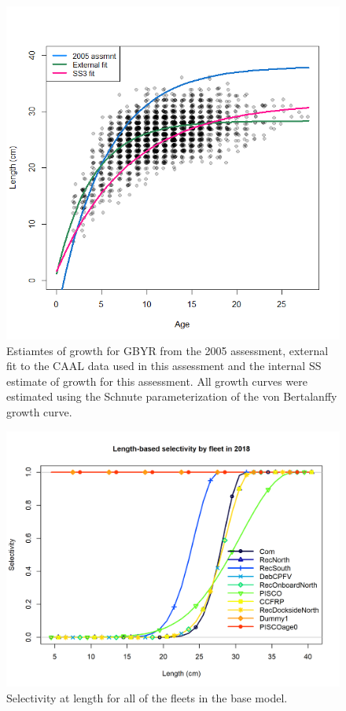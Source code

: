 \documentclass[12pt,]{article}
\begin{document}
\begin{figure}
\centering
\includegraphics{Figures/growth_compare.png}
\caption{Estiamtes of growth for GBYR from the 2005 assessment, external
fit to the CAAL data used in this assessment and the internal SS
estimate of growth for this assessment. All growth curves were estimated
using the Schnute parameterization of the von Bertalanffy growth curve.
\label{fig:growth_compare}}
\end{figure}

\FloatBarrier

\begin{figure}
\centering
\includegraphics{r4ss/plots_mod1/sel01_multiple_fleets_length1.png}
\caption{Selectivity at length for all of the fleets in the base model.
\label{fig:sel01_multiple_fleets_length1}}
\end{figure}
\end{document}
